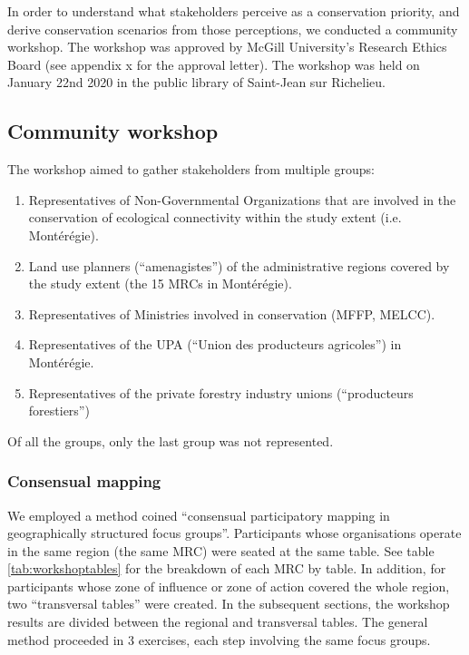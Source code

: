 In order to understand what stakeholders perceive as a conservation priority, and derive conservation scenarios from those perceptions, we conducted a community workshop. The workshop was approved by McGill University’s Research Ethics Board (see appendix {x} for the approval letter). The workshop was held on January 22nd 2020 in the public library of Saint-Jean sur Richelieu. \\

\subsection{Community workshop}

The workshop aimed to gather stakeholders from multiple groups:
\begin{enumerate}
  \item Representatives of Non-Governmental Organizations that are involved in the conservation of ecological connectivity within the study extent (i.e. Montérégie).
  \item Land use planners (“amenagistes”) of the administrative regions covered by the study extent (the 15 MRCs in Montérégie).
  \item Representatives of Ministries involved in conservation (MFFP, MELCC).
  \item Representatives of the UPA (“Union des producteurs agricoles”) in Montérégie.
  \item Representatives of the private forestry industry unions (“producteurs forestiers”)
\end{enumerate}
Of all the groups, only the last group was not represented. \\

\subsubsection{Consensual mapping}

We employed a method coined “consensual participatory mapping in geographically structured focus groups”. Participants whose organisations operate in the same region (the same MRC) were seated at the same table. See table \ref{tab:workshoptables} for the breakdown of each MRC by table. In addition, for participants whose zone of influence or zone of action covered the whole region, two “transversal tables” were created. In the subsequent sections, the workshop results are divided between the regional and transversal tables.
The general method proceeded in 3 exercises, each step involving the same focus groups.

